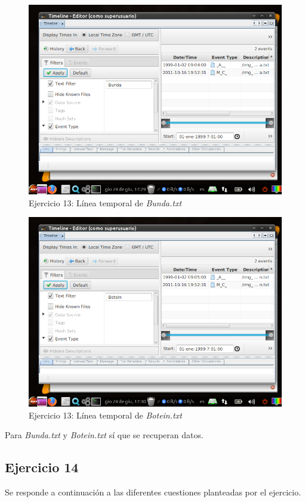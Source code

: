 \documentclass[11pt]{article}
\begin{document}
\begin{figure}[H]
    \caption{Ejercicio 13: Línea temporal de \textit{Bunda.txt}}
    \centering
    \includegraphics[scale=0.7]{p03/e13-9.png}
\end{figure}

\begin{figure}[H]
    \caption{Ejercicio 13: Línea temporal de \textit{Botein.txt}}
    \centering
    \includegraphics[scale=0.7]{p03/e13-10.png}
\end{figure}

Para \textit{Bunda.txt} y \textit{Botein.txt} sí que se recuperan datos.

\subsection{Ejercicio 14}
Se responde a continuación a las diferentes cuestiones planteadas por el ejercicio.
\end{document}
